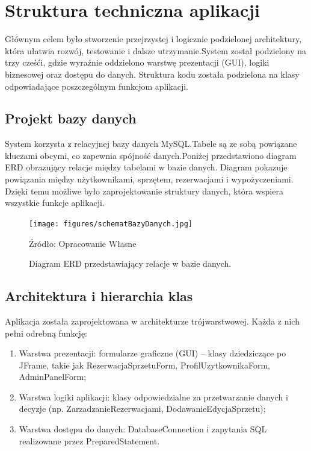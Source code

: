 \chapter{Struktura techniczna aplikacji}
\label{cha:budowaSystemuIstruktura}

Głównym celem było stworzenie przejrzystej i logicznie podzielonej architektury, która ułatwia rozwój, testowanie i dalsze utrzymanie.System został podzielony na trzy cześći, gdzie wyraźnie oddzielono warstwę prezentacji (GUI), logiki biznesowej oraz dostępu do danych. Struktura kodu została podzielona na klasy odpowiadające poszczególnym funkcjom aplikacji.
\section{Projekt bazy danych}
System korzysta z relacyjnej bazy danych MySQL.Tabele są ze sobą powiązane kluczami obcymi, co zapewnia spójność danych.Poniżej przedstawiono diagram ERD obrazujący relacje między tabelami w bazie danych. Diagram pokazuje powiązania między użytkownikami, sprzętem, rezerwacjami i wypożyczeniami. Dzięki temu możliwe było zaprojektowanie struktury danych, która wspiera wszystkie funkcje aplikacji.

\begin{figure}[H]
    \centering
    \texttt{[image: figures/schematBazyDanych.jpg]}
    \caption{Diagram ERD przedstawiający relacje w bazie danych.}
    \label{fig:diagram_erd}
    \small{Źródło: Opracowanie Własne}
\end{figure}
\clearpage
\section{Architektura i hierarchia klas}
Aplikacja została zaprojektowana w architekturze trójwarstwowej. Każda z nich pełni odrebną funkcję:
\begin{enumerate}
    \item Warstwa prezentacji: formularze graficzne (GUI) – klasy dziedziczące po JFrame, takie jak RezerwacjaSprzetuForm, ProfilUzytkownikaForm, AdminPanelForm;
    \item Warstwa logiki aplikacji: klasy odpowiedzialne za przetwarzanie danych i decyzje (np. ZarzadzanieRezerwacjami, DodawanieEdycjaSprzetu);
    \item Warstwa dostępu do danych: DatabaseConnection i zapytania SQL realizowane przez PreparedStatement.
\end{enumerate}

